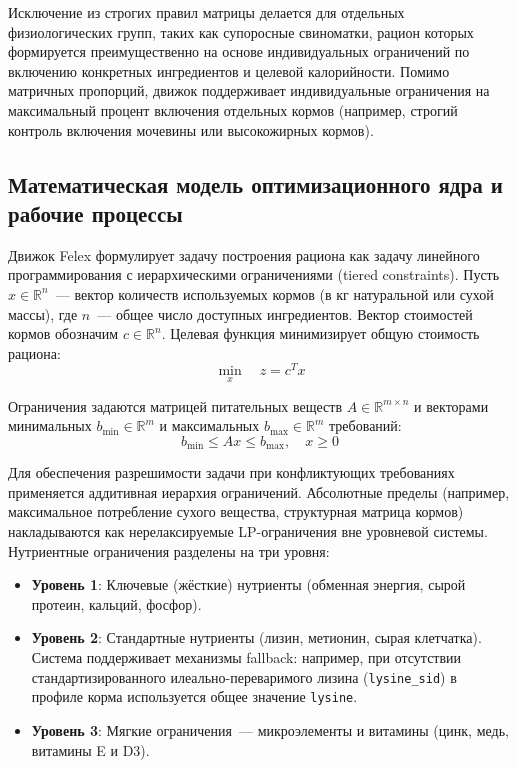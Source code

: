 \documentclass[a4paper,fleqn]{cas-sc}
\begin{document}
Исключение из строгих правил матрицы делается для отдельных физиологических групп, таких как супоросные свиноматки, рацион которых формируется преимущественно на основе индивидуальных ограничений по включению конкретных ингредиентов и целевой калорийности. Помимо матричных пропорций, движок поддерживает индивидуальные ограничения на максимальный процент включения отдельных кормов (например, строгий контроль включения мочевины или высокожирных кормов).

\subsection{Математическая модель оптимизационного ядра и рабочие процессы}\label{subsec:optimization}

Движок Felex формулирует задачу построения рациона как задачу линейного программирования с иерархическими ограничениями (tiered constraints). Пусть $x \in \mathbb{R}^n$~--- вектор количеств используемых кормов (в кг натуральной или сухой массы), где $n$~--- общее число доступных ингредиентов. Вектор стоимостей кормов обозначим $c \in \mathbb{R}^n$. Целевая функция минимизирует общую стоимость рациона:
\begin{equation}
\min_{x} \quad z = c^T x
\end{equation}

Ограничения задаются матрицей питательных веществ $A \in \mathbb{R}^{m \times n}$ и векторами минимальных $b_{\min} \in \mathbb{R}^m$ и максимальных $b_{\max} \in \mathbb{R}^m$ требований:
\begin{equation}
b_{\min} \leq A x \leq b_{\max}, \quad x \geq 0
\end{equation}

Для обеспечения разрешимости задачи при конфликтующих требованиях применяется аддитивная иерархия ограничений. Абсолютные пределы (например, максимальное потребление сухого вещества, структурная матрица кормов) накладываются как нерелаксируемые LP-ограничения вне уровневой системы. Нутриентные ограничения разделены на три уровня:
\begin{itemize}
    \item \textbf{Уровень 1}: Ключевые (жёсткие) нутриенты (обменная энергия, сырой протеин, кальций, фосфор).
    \item \textbf{Уровень 2}: Стандартные нутриенты (лизин, метионин, сырая клетчатка). Система поддерживает механизмы fallback: например, при отсутствии стандартизированного илеально-переваримого лизина (\texttt{lysine\_sid}) в профиле корма используется общее значение \texttt{lysine}.
    \item \textbf{Уровень 3}: Мягкие ограничения~--- микроэлементы и витамины (цинк, медь, витамины E и D3).
\end{itemize}
\end{document}
